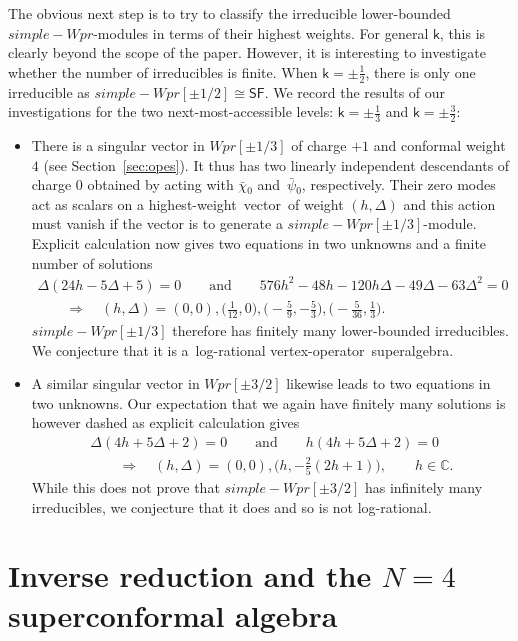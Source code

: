 \documentclass[10pt,a4paper]{amsart}
\numberwithin{equation}{section}
\newcommand{\bchi}{\bar{\chi}{}} %
\newcommand{\bpsi}{\bar{\psi}{}} %
\newcommand{\kk}{\mathsf{k}} %
\newcommand{\Ra}{\Rightarrow}
\newcommand{\fld}[1]{\mathbb{#1}} %
\newcommand{\VOA}[1]{\mathsf{#1}} %
\newcommand{\CC}{\fld{C}}
\newcommand{\sfsymb}{\VOA{SF}}
\newcommand{\sfvoa}{\sfsymb} %
\newcommand{\uwalg}[2]{\VOA{W}^{#1}_{\mathrm{#2}}} %
\newcommand{\swalg}[2]{\VOA{W}_{#1}^{\mathrm{#2}}} %
\newcommand{\upr}[1][\kk]{\uwalg{#1}{pr}} %
\newcommand{\spr}[1][\kk]{\swalg{#1}{pr}} %
\newcommand{\hw}{highest-weight}
\newcommand{\hwv}{\hw\ vector}
\newcommand{\vo}{vertex-operator}
\newcommand{\svoa}{\vo\ superalgebra}
\def\boldsymbol#1{#1}
\def\smash#1{#1}
\def\upr{Wpr}
\def\spr{simple-Wpr}
\begin{document}
The obvious next step is to try to classify the irreducible lower-bounded $\spr$-modules in terms of their highest weights.
For general $\kk$, this is clearly beyond the scope of the paper.
However, it is interesting to investigate whether the number of irreducibles is finite.
When \smash{$\kk=\pm\frac{1}{2}$}, there is only one irreducible as \smash{$\spr[\pm1/2] \cong \sfvoa$}.
We record the results of our investigations for the two next-most-accessible levels: $\kk=\pm\frac{1}{3}$ and $\kk=\pm\frac{3}{2}$:
\begin{itemize}\itemsep=0pt
 \item There is a singular vector in \smash{$\upr[\pm1/3]$} of charge $+1$ and conformal weight $4$ (see Section~\ref{sec:opes}).
 It thus has two linearly independent descendants of charge $0$ obtained by acting with $\bchi_0$ and~$\bpsi_0$, respectively.
 Their zero modes act as scalars on a \hwv\ of weight $(h,\Delta)$ and this action must vanish if the vector is to generate a $\spr[\pm1/3]$-module.
 Explicit calculation now gives two equations in two unknowns and a finite number of solutions
 \begin{gather*}
 \Delta (24h - 5\Delta + 5) = 0 \qquad \text{and} \qquad
 576h^2 - 48h - 120h\Delta - 49\Delta - 63\Delta^2 = 0 \\
 \qquad\Ra \quad (h,\Delta) = (0,0),\bigl(\tfrac{1}{12},0\bigr),\bigl(-\tfrac{5}{9},-\tfrac{5}{3}\bigr),\bigl(-\tfrac{5}{36},\tfrac{1}{3}\bigr).
 \end{gather*}
 $\spr[\pm1/3]$ therefore has finitely many lower-bounded irreducibles.
 We conjecture that it is a~log-rational \svoa.
 \item A similar singular vector in \smash{$\upr[\pm3/2]$} likewise leads to two equations in two unknowns.
 Our expectation that we again have finitely many solutions is however dashed as explicit calculation gives
 \begin{gather*}
 \Delta (4h + 5\Delta + 2) = 0 \qquad \text{and} \qquad
 h (4h + 5\Delta + 2) = 0 \\
 \qquad \Ra \quad (h,\Delta) = (0,0), \bigl(h,-\tfrac{2}{5}(2h+1)\bigr), \qquad h \in \CC.
 \end{gather*}
 While this does not prove that $\spr[\pm3/2]$ has infinitely many irreducibles, we conjecture that it does and so is not log-rational.
\end{itemize}

\section[Inverse reduction and the N=4 superconformal algebra]{Inverse reduction and the $\boldsymbol{N=4}$ superconformal algebra} \label{sec:InvRed}
\end{document}
